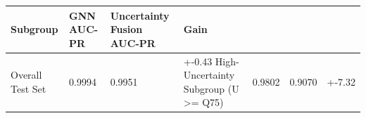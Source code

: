\begin{tabular}{llll}
\toprule
Subgroup & GNN AUC-PR & Uncertainty Fusion AUC-PR & Gain \\
\midrule
Overall Test Set & 0.9994 & 0.9951 & +-0.43%
High-Uncertainty Subgroup (U >= Q75) & 0.9802 & 0.9070 & +-7.32%
\bottomrule
\end{tabular}
